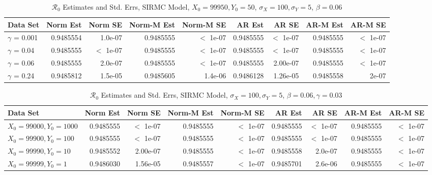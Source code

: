 \documentclass[12pt]{article}
\newcommand{\rr}{\ensuremath{\mathcal{R}_0}}
\begin{document}
\begin{table}[H]
	
	\caption{\label{tab:}$\rr$ Estimates and Std. Errs, SIRMC Model,
		$X_0 = 99950, Y_0 = 50$, $\sigma_X = 100, \sigma_Y = 5$, $\beta = 0.06$}
	\centering
	\begin{footnotesize}
		\begin{tabular}[t]{l|r|r|r|r|r|r|r|r}
			\hline
			Data Set & Norm Est & Norm SE & Norm-M Est & Norm-M SE & AR Est & AR SE & AR-M Est & AR-M SE\\
			\hline
			$\gamma$ = 0.001 & 0.9485554 & 1.0e-07 & 0.9485555 & $<$ 1e-07 & 0.9485555 & $<$ 1e-07 & 0.9485555 & $<$ 1e-07\\
			\hline
			$\gamma$ = 0.04 & 0.9485555 & $<$ 1e-07 & 0.9485555 & $<$ 1e-07 & 0.9485555 & $<$ 1e-07 & 0.9485555 & $<$ 1e-07\\
			\hline
			$\gamma$ = 0.06 & 0.9485555 & 2.0e-07 & 0.9485555 & $<$ 1e-07 & 0.9485555 & 2.00e-07 & 0.9485555 & $<$ 1e-07\\
			\hline
			$\gamma$ = 0.24 & 0.9485812 & 1.5e-05 & 0.9485605 & 1.4e-06 & 0.9486128 & 1.26e-05 & 0.9485558 & 2e-07\\
			\hline
		\end{tabular}
	\end{footnotesize}
\end{table}

\begin{table}[H]
	
	\caption{\label{tab:}$\rr$ Estimates and Std. Errs, SIRMC Model,
		$\sigma_X = 100, \sigma_Y = 5$, $\beta = 0.06, \gamma = 0.03$}
	\centering
	\begin{footnotesize}
		\begin{tabular}[t]{l|r|r|r|r|r|r|r|r}
			\hline
			Data Set & Norm Est & Norm SE & Norm-M Est & Norm-M SE & AR Est & AR SE & AR-M Est & AR-M SE\\
			\hline
			$X_0 = 99000, Y_0 = 1000$ & 0.9485555 & $<$ 1e-07 & 0.9485555 & $<$ 1e-07 & 0.9485555 & $<$ 1e-07 & 0.9485555 & $<$ 1e-07\\
			\hline
			$X_0 = 99900, Y_0 = 100$ & 0.9485555 & $<$ 1e-07 & 0.9485555 & $<$ 1e-07 & 0.9485555 & $<$ 1e-07 & 0.9485555 & $<$ 1e-07\\
			\hline
			$X_0 = 99990, Y_0 = 10$ & 0.9485552 & 2.00e-07 & 0.9485555 & $<$ 1e-07 & 0.9485558 & 2.0e-07 & 0.9485555 & $<$ 1e-07\\
			\hline
			$X_0 = 99999, Y_0 = 1$ & 0.9486030 & 1.56e-05 & 0.9485557 & $<$ 1e-07 & 0.9485701 & 2.6e-06 & 0.9485555 & $<$ 1e-07\\
			\hline
		\end{tabular}
	\end{footnotesize}
\end{table}
\end{document}
